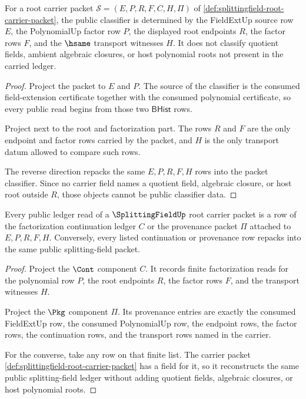 \begin{theorem}
\label{thm:splittingfield-root-classifier-obligation}
For a root carrier packet
$\mathcal{S}=(E,P,R,F,C,H,\Pi)$ of
\autoref{def:splittingfield-root-carrier-packet}, the public classifier is
determined by the FieldExtUp source row $E$, the PolynomialUp factor row
$P$, the displayed root endpoints $R$, the factor rows $F$, and the
$\hsame$ transport witnesses $H$. It does not classify quotient fields,
ambient algebraic closures, or host polynomial roots not present in the
carried ledger.
\end{theorem}
\begin{proof}
Project the packet to $E$ and $P$. The source of the classifier is the
consumed field-extension certificate together with the consumed polynomial
certificate, so every public read begins from those two $\mathsf{BHist}$
rows.

Project next to the root and factorization part. The rows $R$ and $F$ are
the only endpoint and factor rows carried by the packet, and $H$ is the only
transport datum allowed to compare such rows.

The reverse direction repacks the same $E,P,R,F,H$ rows into the packet
classifier. Since no carrier field names a quotient field, algebraic
closure, or host root outside $R$, those objects cannot be public classifier
data.
\end{proof}

\begin{theorem}
\label{thm:splittingfield-root-ledger-obligation}
Every public ledger read of a $\SplittingFieldUp$ root carrier packet is a
row of the factorization continuation ledger $C$ or the provenance packet
$\Pi$ attached to $E,P,R,F,H$. Conversely, every listed continuation or
provenance row repacks into the same public splitting-field packet.
\end{theorem}
\begin{proof}
Project the $\Cont$ component $C$. It records finite factorization reads for
the polynomial row $P$, the root endpoints $R$, the factor rows $F$, and the
transport witnesses $H$.

Project the $\Pkg$ component $\Pi$. Its provenance entries are exactly the
consumed FieldExtUp row, the consumed PolynomialUp row, the endpoint rows,
the factor rows, the continuation rows, and the transport rows named in the
carrier.

For the converse, take any row on that finite list. The carrier packet
\autoref{def:splittingfield-root-carrier-packet} has a field for it, so it
reconstructs the same public splitting-field ledger without adding quotient
fields, algebraic closures, or host polynomial roots.
\end{proof}

